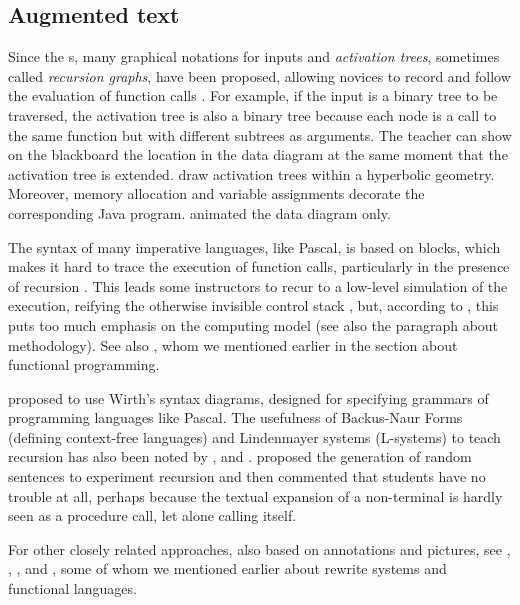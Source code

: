 \documentclass[11pt,a4paper]{article}
\newcommand\plang[1]{\textsf{#1}\xspace}
\begin{document}
\subsection{Augmented text}
\label{augmented_text}

Since the s, many graphical notations for inputs
and \emph{activation trees}, sometimes called \emph{recursion graphs},
have been proposed, allowing novices to record and follow the
evaluation of function calls
\citep{Jackson:1976,Kruse:1982,Haynes:1995,Hsin:2008}. For example, if
the input is a binary tree to be traversed, the activation tree is
also a binary tree because each node is a call to the same function
but with different subtrees as arguments. The teacher can show on the
blackboard the location in the data diagram at the same moment that
the activation tree is extended. \textcite{WeiMurray:2008} draw
activation trees within a hyperbolic geometry. Moreover, memory
allocation and variable assignments decorate the corresponding
\plang{Java} program. \textcite{KurtzJohnson:1985} animated the data
diagram only.

The syntax of many imperative languages, like \plang{Pascal}, is based
on blocks, which makes it hard to trace the execution of function
calls, particularly in the presence of recursion \citep{Er:1984}. This
leads some instructors to recur to a low\hyp{}level simulation of the
execution, reifying the otherwise invisible control stack
\citep{LeeMitchell:1985,Dupuis:1989}, but, according to
\textcite{GinatShifroni:1999}, this puts too much emphasis on the
computing model (see also the paragraph about methodology). See also
\textcite{Pirolli:1986}, whom we mentioned earlier in the section
about functional programming.

\textcite{BellGilbert:1974} proposed to use Wirth's syntax diagrams,
designed for specifying grammars of programming languages like
\plang{Pascal}. The usefulness of Backus\hyp{}Naur Forms (defining
context\hyp{}free languages) and Lindenmayer systems (L-systems) to
teach recursion has also been noted by \textcite{Er:1984},
\textcite{Proulx:1997} and \textcite{Velazquez:1999}
\citeyearpar{Velazquez:2000}. \textcite{Zelenski:1999} proposed the
generation of random sentences to experiment recursion and
\textcite{Levine:2000} then commented that students have no trouble at
all, perhaps because the textual expansion of a non\hyp{}terminal is
hardly seen as a procedure call, let alone calling itself.

For other closely related approaches, also based on annotations and
pictures, see \textcite{Er:1995}, \textcite{HuiIverson:1995},
\textcite{JehngTungChang:1999}, \textcite{George:1995}
\citeyearpar{George:1996} \citeyearpar{George:2000a}
\citeyearpar{George:2000b} and \textcite{TungChangWongJehng:2001},
some of whom we mentioned earlier about rewrite systems and functional
languages.
\end{document}
